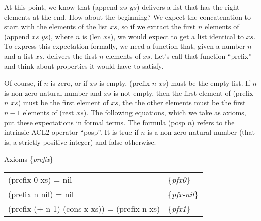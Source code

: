 At this point, we know that (append $xs$ $ys$) delivers 
a list that has the right elements at the end. 
How about the beginning?
We expect the concatenation to start with the elements of the list $xs$, 
so if we extract the first $n$ elements of (append $xs$ $ys$), where $n$ is (len $xs$), 
we would expect to get a list identical to $xs$. 
To express this expectation formally, we need a function that, 
given a number $n$ and a list $xs$, delivers the first $n$ elements of $xs$. 
Let's call that function ``prefix'' and think about properties it would have to satisfy.

Of course, if $n$ is zero, or if $xs$ is empty, 
(prefix $n$ $xs$) must be the empty list. 
If $n$ is non-zero natural number and $xs$ is not empty, 
then the first element of (prefix $n$ $xs$) must be the first element of $xs$, 
the the other elements must be the first $n-1$ elements of (rest $xs$). 
The following equations, which we take as axioms, 
put these expectations in formal terms. 
The formula (posp $n$) refers to the intrinsic ACL2 operator ``posp''. 
It is true if $n$ is a non-zero natural number 
(that is, a strictly positive integer) and false otherwise.

\label{prefix-equations}
\begin{center}
Axioms \{\emph{prefix}\}                                           \\
\begin{tabular}{ll}
(prefix 0 xs) = nil                          & \{\emph{pfx0}\}     \\
(prefix n nil) =  nil                        & \{\emph{pfx-nil}\}  \\
(prefix (+ n 1) (cons x xs)) = (prefix n xs) & \{\emph{pfx1}\}     \\
\end{tabular}
\end{center}


